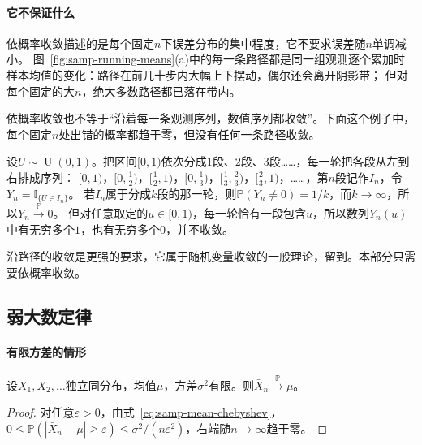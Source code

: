 \paragraph{它不保证什么}
依概率收敛描述的是每个固定$n$下误差分布的集中程度，它不要求误差随$n$单调减小。
图~\ref{fig:samp-running-means}(a)中的每一条路径都是同一组观测逐个累加时样本均值的变化：路径在前几十步内大幅上下摆动，偶尔还会离开阴影带；
但对每个固定的大$n$，绝大多数路径都已落在带内。

依概率收敛也不等于“沿着每一条观测序列，数值序列都收敛”。下面这个例子中，每个固定$n$处出错的概率都趋于零，但没有任何一条路径收敛。

\begin{example}[出错概率趋于零而路径不收敛]
\label{ex:samp-typewriter}
设$U\sim\operatorname{U}(0,1)$。把区间$[0,1)$依次分成$1$段、$2$段、$3$段……，每一轮把各段从左到右排成序列：
$[0,1)$，$[0,\tfrac12)$，$[\tfrac12,1)$，$[0,\tfrac13)$，$[\tfrac13,\tfrac23)$，$[\tfrac23,1)$，……，第$n$段记作$I_n$，令$Y_n=\mathbb{I}_{\{U\in I_n\}}$。
若$I_n$属于分成$k$段的那一轮，则$\mathbb{P}(Y_n\ne0)=1/k$，而$k\to\infty$，所以$Y_n\xrightarrow{\mathbb{P}}0$。
但对任意取定的$u\in[0,1)$，每一轮恰有一段包含$u$，所以数列$Y_n(u)$中有无穷多个$1$，也有无穷多个$0$，并不收敛。
\end{example}

沿路径的收敛是更强的要求，它属于随机变量收敛的一般理论，留到。本部分只需要依概率收敛。

\subsection{弱大数定律}

\paragraph{有限方差的情形}

\begin{theorem}
\label{thm:samp-wlln-variance}
设$X_1,X_2,\dots$独立同分布，均值$\mu$，方差$\sigma^2$有限。则$\bar X_n\xrightarrow{\mathbb{P}}\mu$。
\end{theorem}

\begin{proof}
对任意$\varepsilon>0$，由式~\eqref{eq:samp-mean-chebyshev}，$0\leq\mathbb{P}(|\bar X_n-\mu|\geq\varepsilon)\leq\sigma^2/(n\varepsilon^2)$，右端随$n\to\infty$趋于零。
\end{proof}

